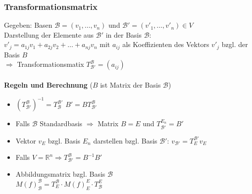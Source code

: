 \documentclass[6pt,a4paper]{scrartcl}
\newcommand{\enbrace}[1]{\ensuremath{\left(#1\right)}}
\begin{document}
\begin{multicols*}{4}
\subsubsection{Transformationsmatrix}
Gegeben: Basen $\mathcal B=(v_1, \dots,v_n)$ und $\mathcal B'=(v'_1,\dots,v'_n) \in V$ \\
Darstellung der Elemente aus $\mathcal B'$ in der Basis $\mathcal B$:\\
$v'_j = a_{1j}v_1+a_{2j}v_2+\dots+a_{nj}v_n$ mit $a_{ij}$ als Koeffizienten des Vektors $v'_j$ bzgl. der Basis $B$\\
$\Rightarrow$ Transformationsmatix $T_{\mathcal B'}^{\mathcal B}=(a_{ij})$\\ \\
\textbf{Regeln und Berechnung} ($B$ ist Matrix der Basis $\mathcal B$)
\begin{itemize}\itemsep0pt
\item $\enbrace{T_{\mathcal B'}^{\mathcal B}}^{-1}=T_{\mathcal B}^{\mathcal B'}$ \quad \qquad $B'=BT_{\mathcal B'}^{\mathcal B}$\\
\item Falls $\mathcal B$ Standardbasis $\Rightarrow$ Matrix $B=E$ und $T_{\mathcal B'}^{E_n}=B'$
\item Vektor $v_E$ bzgl. Basis $E_n$ darstellen bzgl. Basis $\mathcal B'$: $v_{\mathcal B'}=T_{E}^{\mathcal B'}v_E$
\item Falls $V = \mathbb{R}^n \Rightarrow T_{\mathcal B'}^{\mathcal B}=B^{-1}B'$
\
\item Abbildungsmatrix bzgl. Basis $\mathcal{B}$ \\
$M(f)_{\mathcal{B}}^{\mathcal{B}}=T_{E}^{\mathcal{B}} \cdot M(f)_E^E \cdot T_{\mathcal{B}}^E$
\end{itemize}\itemsep0pt


\end{multicols*}
\end{document}
